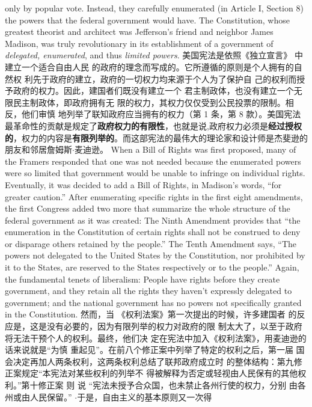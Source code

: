 \begin{paracol}{2}
only by popular vote. Instead, they carefully enumerated (in
Article I, Section 8) the powers that the federal government
would have. The Constitution, whose greatest theorist and architect was Jefferson's friend and neighbor James Madison, was truly revolutionary in its establishment of a government of \textit{delegated, enumerated}, and thus \textit{limited powers}.
\switchcolumn
美国宪法是依照《独立宣言》 中建立一个适合自由人民
的政府的理念而写成的。它所遵循的原则是个人拥有的自然权
利先于政府的建立，政府的一切权力均来源于个人为了保护自
己的权利而授予政府的权力。因此，建国者们既没有建立一个
君主制政体，也没有建立一个无限民主制政体，即政府拥有无
限的权力，其权力仅仅受到公民投票的限制。相反，他们审慎
地列举了联知政府应当拥有的权力（第 1 条，第 8 款）。美国宪法最革命性的贡献是规定了\textbf{政府权力的有限性}，也就是说,政府权力必须是\textbf{经过授权的}，权力的内容是\textbf{有限列举的}。而这部宪法的最伟大的理论家和设计师是杰斐逊的朋友和邻居詹姆斯$\cdot$麦迪逊。
\switchcolumn*
When a Bill of Rights was first proposed, many of the
Framers responded that one was not needed because the enumerated powers were so limited that government would be unable to infringe on individual rights. Eventually, it was decided
to add a Bill of Rights, in Madison's words, ``for greater caution.'' After enumerating specific rights in the first eight
amendments, the first Congress added two more that summarize the whole structure of the federal government as it was created: The Ninth Amendment provides that ``the enumeration
in the Constitution of certain rights shall not be construed to
deny or disparage others retained by the people.'' The Tenth
Amendment says, ``The powers not delegated to the United
States by the Constitution, nor prohibited by it to the States,
are reserved to the States respectively or to the people.'' Again,
the fundamental tenets of liberalism: People have rights before
they create government, and they retain all the rights they
haven't expressly delegated to government; and the national
government has no powers not specifically granted in the Constitution.
\switchcolumn
然而，当 《权利法案》第一次提出的时候，许多建国者
的反应是，这是没有必要的，因为有限列举的权力对政府的限
制太大了，以至于政府将无法干预个人的权利。最终，他们决
定在宪法中加入《权利法案》，用麦迪逊的话来说就是“为慎
重起见”。在前八个修正案中列举了特定的权利之后，第一届
国会决定再加人两条权利，这两条权利总结了联邦政府成立时
的整体结构：第九修正案规定“本宪法对某些权利的列举不
得被解释为否定或轻视由人民保有的其他权利。”第十修正案
则 说 “宪法未授予合众国，也未禁止各州行使的权力，分别
由各州或由人民保留。” $\cdot$于是，自由主义的基本原则又一次得

\end{paracol}
